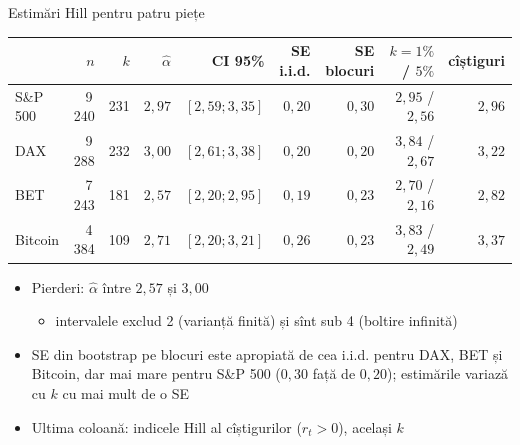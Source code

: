 \begin{frame}{Estimări Hill pentru patru piețe}
\itemsize{\footnotesize}
\begin{center}
\scriptsize
\begin{tabular}{lrrrrrrrr}
\toprule
& $n$ & $k$ & $\hat\alpha$ & CI 95\% & SE i.i.d. & SE blocuri & $k = 1\%$ / $5\%$ & cîștiguri \\
\midrule
S\&P 500 & 9\,240 & 231 & $2{,}97$ & $[2{,}59; 3{,}35]$ & $0{,}20$ & $0{,}30$ & $2{,}95$ / $2{,}56$ & $2{,}96$ \\
DAX & 9\,288 & 232 & $3{,}00$ & $[2{,}61; 3{,}38]$ & $0{,}20$ & $0{,}20$ & $3{,}84$ / $2{,}67$ & $3{,}22$ \\
BET & 7\,243 & 181 & $2{,}57$ & $[2{,}20; 2{,}95]$ & $0{,}19$ & $0{,}23$ & $2{,}70$ / $2{,}16$ & $2{,}82$ \\
Bitcoin & 4\,384 & 109 & $2{,}71$ & $[2{,}20; 3{,}21]$ & $0{,}26$ & $0{,}23$ & $3{,}83$ / $2{,}49$ & $3{,}37$ \\
\bottomrule
\end{tabular}
\end{center}
\begin{itemize}
    \item Pierderi: $\hat\alpha$ între $2{,}57$ și $3{,}00$
    \begin{itemize}
        \item intervalele exclud 2 (varianță finită) și sînt sub 4 (boltire infinită)
    \end{itemize}
    \item SE din bootstrap pe blocuri este apropiată de cea i.i.d. pentru DAX, BET și Bitcoin, dar mai mare pentru S\&P 500 ($0{,}30$ față de $0{,}20$); estimările variază cu $k$ cu mai mult de o SE
    \item Ultima coloană: indicele Hill al cîștigurilor ($r_t > 0$), același $k$
\end{itemize}
\end{frame}

